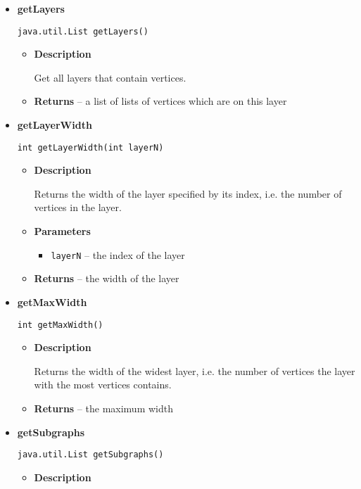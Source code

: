 {{{{{{{{{{{{\begin{itemize}
{\begin{itemize}
{Get the amount of layers.
}
\item{{\bf  Returns} -- 
the amount of layers that contain at least one vertex 
}%
\end{itemize}
}%
\item{ 
{\bf  getLayers}\\
\begin{lstlisting}[frame=none]
java.util.List getLayers()\end{lstlisting} %
\begin{itemize}
\item{
{\bf  Description}

Get all layers that contain vertices.
}
\item{{\bf  Returns} -- 
a list of lists of vertices which are on this layer 
}%
\end{itemize}
}%
\item{ 
{\bf  getLayerWidth}\\
\begin{lstlisting}[frame=none]
int getLayerWidth(int layerN)\end{lstlisting} %
\begin{itemize}
\item{
{\bf  Description}

Returns the width of the layer specified by its index, i.e. the number of vertices in the layer.
}
\item{
{\bf  Parameters}
  \begin{itemize}
   \item{
\texttt{layerN} -- the index of the layer}
  \end{itemize}
}%
\item{{\bf  Returns} -- 
the width of the layer 
}%
\end{itemize}
}%
\item{ 
{\bf  getMaxWidth}\\
\begin{lstlisting}[frame=none]
int getMaxWidth()\end{lstlisting} %
\begin{itemize}
\item{
{\bf  Description}

Returns the width of the widest layer, i.e. the number of vertices the layer with the most vertices contains.
}
\item{{\bf  Returns} -- 
the maximum width 
}%
\end{itemize}
}%
\item{ 
{\bf  getSubgraphs}\\
\begin{lstlisting}[frame=none]
java.util.List getSubgraphs()\end{lstlisting} %
\begin{itemize}
\item{
{\bf  Description}

}
\end{itemize}}
\end{itemize}}}}}}}}}}}}}
